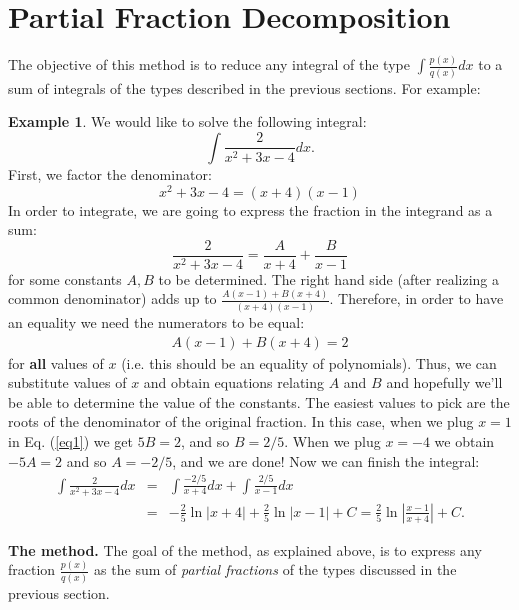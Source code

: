 \documentclass[12pt]{article}
\theoremstyle{definition}
\newtheorem{exa}[thm]{Example}
\begin{document}
\section{Partial Fraction Decomposition}
The objective of this method is to reduce any integral of the type
$\int \frac{p(x)}{q(x)}dx$ to a sum of integrals of the types
described in the previous sections. For example:
\begin{exa}
We would like to solve the following integral:
$$\int \frac{2}{x^2+3x-4}dx.$$
First, we factor the denominator: $$x^2+3x-4=(x+4)(x-1)$$ In order
to integrate, we are going to express the fraction in the
integrand as a sum:
$$\frac{2}{x^2+3x-4}=\frac{A}{x+4}+\frac{B}{x-1}$$
for some constants $A,B$ to be determined. The right hand side
(after realizing a common denominator) adds up to
$\frac{A(x-1)+B(x+4)}{(x+4)(x-1)}$. Therefore, in order to have an
equality we need the numerators to be equal:
\begin{eqnarray}\label{eq1}A(x-1)+B(x+4)=2\end{eqnarray} for {\bf all} values of $x$ (i.e. this
should be an equality of polynomials). Thus, we can substitute
values of $x$ and obtain equations relating $A$ and $B$ and
hopefully we'll be able to determine the value of the constants.
The easiest values to pick are the roots of the denominator of the
original fraction. In this case, when we plug $x=1$ in Eq.
(\ref{eq1}) we get $5B=2$, and so $B=2/5$. When we plug $x=-4$ we
obtain $-5A=2$ and so $A=-2/5$, and we are done! Now we can finish
the integral: \begin{eqnarray*}\int
\frac{2}{x^2+3x-4}dx &=& \int\frac{-2/5}{x+4}dx+\int\frac{2/5}{x-1}dx\\
&=&
-\frac{2}{5}\ln|x+4|+\frac{2}{5}\ln|x-1|+C=\frac{2}{5}\ln|\frac{x-1}{x+4}|
+C.\end{eqnarray*}
\end{exa}
{\bf The method.} The goal of the method, as explained above, is
to express any fraction $\frac{p(x)}{q(x)}$ as the sum of {\it
partial fractions} of the types discussed in the previous section.
\end{document}
